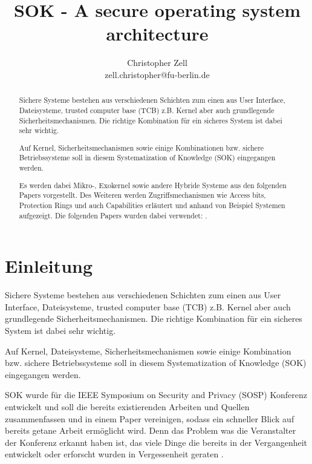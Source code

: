 \documentclass[11pt,technote]{IEEEtran}
\title{SOK - A secure operating system architecture}
\author{Christopher Zell\\
        zell.christopher@fu-berlin.de}
\begin{document}
\maketitle

  \begin{abstract}
    Sichere Systeme bestehen aus verschiedenen Schichten zum einen aus User Interface, Dateisysteme, trusted computer base (TCB)
    z.B. Kernel aber auch grundlegende Sicherheitsmechanismen. Die richtige Kombination f\"ur ein sicheres System ist dabei sehr wichtig.
    
    Auf Kernel, Sicherheitsmechanismen sowie einige Kombinationen bzw. sichere Betriebssysteme soll in diesem
    Systematization of Knowledge (SOK) eingegangen werden.
    
    Es werden dabei Mikro-, Exokernel sowie andere Hybride Systeme aus den folgenden Papers 
    \cite{inproc:micro, inproc:exo, inproc:spin, inproc:eros, inproc:asbestos} vorgestellt.
    Des Weiteren werden Zugriffsmechanismen wie Access bits, Protection Rings und auch Capabilities erl\"autert
    und anhand von Beispiel Systemen aufgezeigt. Die folgenden Papers wurden dabei verwendet:
    \cite{inproc:multics, inproc:protec-rings, inproc:unix, inproc:plan9, inproc:cap}.
  \end{abstract}
  
  \section{Einleitung} \label{sec:intro} 
    Sichere Systeme bestehen aus verschiedenen Schichten zum einen aus User Interface, Dateisysteme, trusted computer base (TCB)
    z.B. Kernel aber auch grundlegende Sicherheitsmechanismen. Die richtige Kombination f\"ur ein sicheres System ist dabei sehr wichtig.
    
    Auf Kernel, Dateisysteme, Sicherheitsmechanismen sowie einige Kombination bzw. sichere Betriebssysteme soll in diesem
    Systematization of Knowledge (SOK) eingegangen werden.
    
    SOK wurde f\"ur die IEEE Symposium on Security and Privacy (SOSP) Konferenz
    entwickelt und soll die bereits existierenden Arbeiten und Quellen zusammenfassen
    und in einem Paper vereinigen, sodass ein schneller Blick auf bereits getane
    Arbeit erm\"oglicht wird. Denn das Problem was die Veranstalter der Konferenz
    erkannt haben ist, das viele Dinge die bereits in der Vergangenheit entwickelt oder
    erforscht wurden in Vergessenheit geraten \cite{Url:sok}.
    
\end{document}
